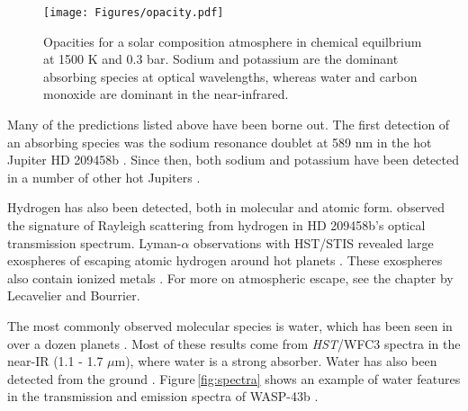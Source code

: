\documentclass[graybox,natbib,nosecnum]{svmult}
\newcommand{\hbindex}[1]{\hl{#1}\index{#1}}  %
\newcommand{\project}[1]{\textsl{#1}}
\newcommand{\HST}{\project{HST}}
\begin{document}
\begin{figure}
\begin{centering}
\texttt{[image: Figures/opacity.pdf]}
\caption{Opacities for a solar composition atmosphere in chemical equilbrium at 1500 K and 0.3 bar. Sodium and potassium are the dominant absorbing species at optical wavelengths, whereas water and carbon monoxide are dominant in the near-infrared.}
\label{fig:opacity}       
\end{centering}
\end{figure}


Many of the predictions listed above have been borne out.  The first detection of an absorbing species was the sodium resonance doublet at 589 nm in the hot Jupiter HD 209458b \citep{charbonneau02}. Since then, both sodium and potassium have been detected in a number of other hot Jupiters \citep[e.g.][]{sing11b, jensen11, nikolov14, fischer16}.

Hydrogen has also been detected, both in molecular and atomic form. \cite{lecavelier08} observed the signature of Rayleigh scattering from hydrogen in HD 209458b's optical transmission spectrum.  Lyman-$\alpha$ observations with HST/STIS revealed  large exospheres of escaping atomic hydrogen around hot planets \citep[e.g.][]{vidal-madjar03, ehrenreich15}.  These exospheres also contain ionized metals \citep[e.g., OI, CII][]{vidal-madjar04}. For more on atmospheric escape, see the chapter by Lecavelier and Bourrier.

The most commonly observed molecular species is water, which has been seen in over a dozen planets \citep[e.g.][]{deming13, huitson13, mccullough14, fraine14, kreidberg14b, kreidberg15b, line16, evans16}. Most of these results come from \HST/WFC3 spectra in the near-IR (1.1 - 1.7 $\mu$m), where water is a strong absorber. Water has also been detected from the ground \citep{birkby13, stevenson16b}.  Figure\,\ref{fig:spectra} shows an example of water features in the transmission and emission spectra of WASP-43b \citep{kreidberg14b}. 
\end{document}
